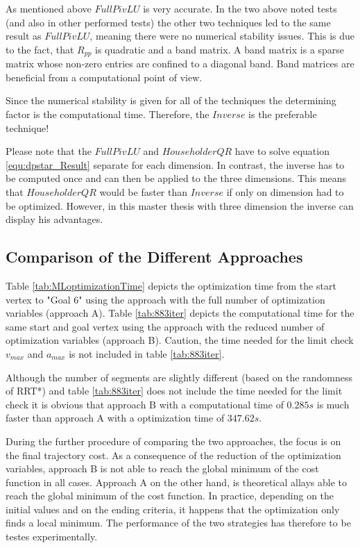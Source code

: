 As mentioned above $FullPivLU$ is very accurate. In the two above noted tests (and also in other performed tests) the other two techniques led to the same result as $FullPivLU$, meaning there were no numerical stability issues. This is due to the fact, that $R_{pp}$ is quadratic and a band matrix. A band matrix is a sparse matrix whose non-zero entries are confined to a diagonal band. Band matrices are beneficial from a computational point of view. \newline

Since the numerical stability is given for all of the techniques the determining factor is the computational time. Therefore, the $Inverse$ is the preferable technique! \newline

Please note that the $FullPivLU$ and $HouseholderQR$ have to solve equation \ref{equ:dpstar_Result} separate for each dimension. In contrast, the inverse has to be computed once and can then be applied to the three dimensions. This means that $HouseholderQR$ would be faster than $Inverse$ if only on dimension had to be optimized. However, in this master thesis with three dimension the inverse can display his advantages.


\subsection{Comparison of the Different Approaches}

Table \ref{tab:MLoptimizationTime} depicts the optimization time from the start vertex to "Goal 6" using the approach with the full number of optimization variables (approach A). Table \ref{tab:883iter} depicts the computational time for the same start and goal vertex using the approach with the reduced number of optimization variables (approach B). Caution, the time needed for the limit check $v_{max}$ and $a_{max}$ is not included in table \ref{tab:883iter}. \newline 

Although the number of segments are slightly different (based on the randomness of RRT*) and table \ref{tab:883iter} does not include the time needed for the limit check it is obvious that approach B with a computational time of $0.285s$ is much faster than approach A with a optimization time of $347.62s$.\newline 


During the further procedure of comparing the two approaches, the focus is on the final trajectory cost.
As a consequence of the reduction of the optimization variables, approach B is not able to reach the global minimum of the cost function in all cases. Approach A on the other hand, is theoretical allays able to reach the global minimum of the cost function. In practice, depending on the initial values and on the ending criteria, it happens that the optimization only finds a local minimum. The performance of the two strategies has therefore to be testes experimentally. \newline

